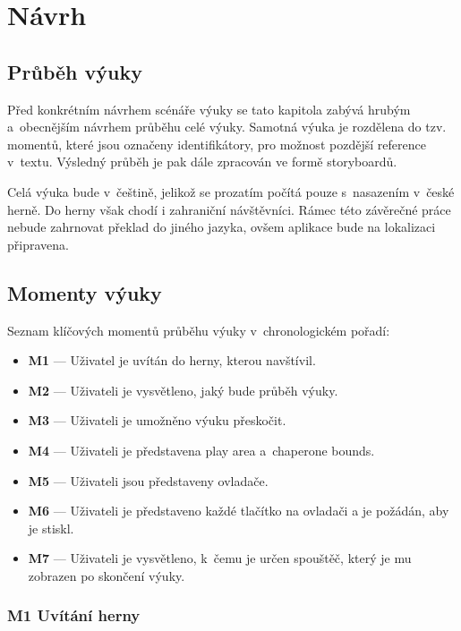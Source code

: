 \chapter{Návrh}\label{nuxe1vrh}

\section{Průběh výuky}\label{prux16fbux11bh-vuxfduky-2}

Před konkrétním návrhem scénáře výuky se tato kapitola zabývá
hrubým a~obecnějším návrhem průběhu celé výuky.
Samotná výuka je rozdělena do tzv. momentů, které jsou označeny
identifikátory, pro možnost pozdější reference v~textu. Výsledný průběh je pak dále zpracován ve formě storyboardů.

Celá výuka bude v~češtině, jelikož se prozatím počítá pouze s~nasazením
v~české herně. Do herny však chodí i zahraniční návštěvníci. Rámec této
závěrečné práce nebude zahrnovat překlad do jiného jazyka, ovšem
aplikace bude na lokalizaci připravena.

\newpage

\section{Momenty výuky}\label{momenty-vuxfduky}

Seznam klíčových momentů průběhu výuky v~chronologickém pořadí:

\begin{itemize}
\tightlist
\item
  \textbf{M1} --- Uživatel je uvítán do herny, kterou navštívil.
\item
  \textbf{M2} --- Uživateli je vysvětleno, jaký bude průběh výuky.
\item
  \textbf{M3} --- Uživateli je umožněno výuku přeskočit.
\item
  \textbf{M4} --- Uživateli je představena play area a~chaperone bounds.
\item
  \textbf{M5} --- Uživateli jsou představeny ovladače.
\item
  \textbf{M6} --- Uživateli je představeno každé tlačítko na ovladači a
  je požádán, aby je stiskl.
\item
  \textbf{M7} --- Uživateli je vysvětleno, k~čemu je určen spouštěč,
  který je mu zobrazen po skončení výuky.
\end{itemize}

\subsection{M1 Uvítání herny}\label{m1-uvuxedtuxe1nuxed-herny}

